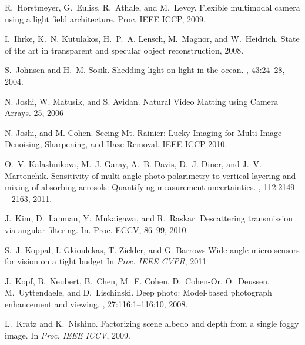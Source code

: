 \documentclass[10pt,twocolumn,letterpaper]{article}
\begin{document}
{\begin{thebibliography}{10}
   R.~Horstmeyer, G.~Euliss, R.~Athale, and
    M.~Levoy.  \newblock Flexible multimodal camera using a light
    field architecture.  \newblock Proc. IEEE ICCP, 2009.

   I.~Ihrke, K.~N. Kutulakos, H.~P.~A. Lensch,
    M.~Magnor, and W.~Heidrich.  \newblock State of the art in
    transparent and specular object reconstruction, 2008.

   S.~Johnsen and H.~M. Sosik.  \newblock Shedding
    light on light in the ocean.  , 43:24--28,
    2004.

   N. Joshi, W. Matusik, and S. Avidan.  \newblock
    Natural Video Matting using Camera Arrays.   25, 2006

   N. Joshi, and M. Cohen.  \newblock Seeing
    Mt. Rainier: Lucky Imaging for Multi-Image Denoising, Sharpening,
    and Haze Removal.  \newblock IEEE ICCP 2010.

   O.~V. Kalashnikova, M.~J. Garay, A.~B. Davis,
    D.~J. Diner, and J.~V.  Martonchik.  \newblock Sensitivity of
    multi-angle photo-polarimetry to vertical layering and mixing of
    absorbing aerosols: Quantifying measurement uncertainties.
    , 112:2149 -- 2163, 2011.

   J.~Kim, D.~Lanman, Y.~Mukaigawa, and R.~Raskar.
    \newblock Descattering transmission via angular filtering.
    \newblock In. Proc. ECCV, 86--99, 2010.


   S.~J. Koppal, I. Gkioulekas, T. Zickler, and
    G. Barrows \newblock Wide-angle micro sensors for vision on a
    tight budget \newblock In {\em Proc. IEEE CVPR}, 2011

   J.~Kopf, B.~Neubert, B.~Chen, M.~F. Cohen,
    D.~Cohen-Or, O.~Deussen, M.~Uyttendaele, and D.~Lischinski.
    \newblock Deep photo: Model-based photograph enhancement and
    viewing.  , 27:116:1--116:10, 2008.

   L.~Kratz and K.~Nishino.  \newblock Factorizing
    scene albedo and depth from a single foggy image.  \newblock In
    {\em Proc. IEEE ICCV}, 2009.


\end{thebibliography}}
\end{document}
